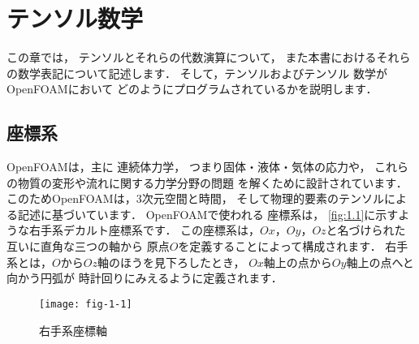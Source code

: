 \chapter{テンソル数学}
\label{chap:1}
この章では，
%
テンソルとそれらの代数演算について，
また本書におけるそれらの数学表記について記述します．
そして，テンソルおよびテンソル
%
数学がOpenFOAMにおいて
どのようにプログラムされているかを説明します．



\section{座標系}
\label{sec:1.1}
OpenFOAMは，主に
%
連続体力学，
つまり固体・液体・気体の応力や，
これらの物質の変形や流れに関する力学分野の問題
を解くために設計されています．
このためOpenFOAMは，3次元空間と時間，
そして物理的要素のテンソルによる記述に基づいています．
OpenFOAMで使われる
%
座標系は，
\autoref{fig:1.1}に示すような右手系デカルト座標系です．
この座標系は，$Ox$，$Oy$，$Oz$と名づけられた互いに直角な三つの軸から
原点$O$を定義することによって構成されます．
右手系とは，$O$から$Oz$軸のほうを見下ろしたとき，
$Ox$軸上の点から$Oy$軸上の点へと向かう円弧が
時計回りにみえるように定義されます．


\begin{figure}[ht]
 \texttt{[image: fig-1-1]}
 \caption{右手系座標軸}
 \label{fig:1.1}
\end{figure}



